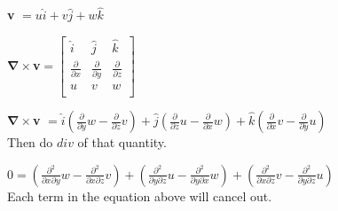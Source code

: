 \documentclass{article}
\renewcommand{\vec}[1]{\bm{#1}} %
\newcommand{\grad}{\vec{\nabla}} %
\begin{document}
    \begin{centering}
    
    {\bf v} $= u\hat{i} + v\hat{j} + w\hat{k}$
    
    $\grad \times ${\bf v}$ =  \begin{bmatrix}
                                \hat{i}&\hat{j}&\hat{k}\\
                                \frac{\partial}{\partial x}
                                & \frac{\partial}{\partial y}
                                & \frac{\partial}{\partial z}\\
                                u&v&w\\
                                \end{bmatrix}$
     
     $\grad \times ${\bf v}
     $= \hat{i}(\frac{\partial}{\partial y} w - \frac{\partial}{\partial z} v)
      + \hat{j}(\frac{\partial}{\partial z} u - \frac{\partial}{\partial x} w)
      + \hat{k}(\frac{\partial}{\partial x} v - \frac{\partial}{\partial y} u)$ \\
      
      Then do $div$ of that quantity.
    
    
      $ 0
      = (\frac{\partial^2}{\partial x \partial y} w - \frac{\partial^2}{\partial x \partial z} v)
      + (\frac{\partial^2}{\partial y \partial z} u - \frac{\partial^2}{\partial y \partial x} w)
      + (\frac{\partial^2}{\partial x \partial z} v - \frac{\partial^2}{\partial y \partial z} u)$ \\
    
    Each term in the equation above will cancel out.
    
    \end{centering}
    
\end{document}
